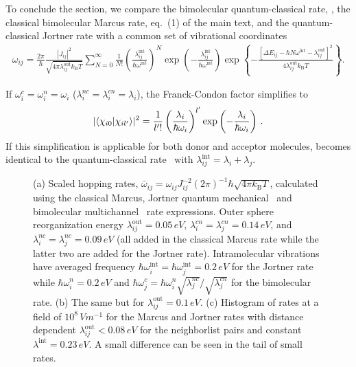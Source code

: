 To conclude the section, we compare the bimolecular quantum-classical rate, , the classical bimolecular Marcus rate, eq.~(1) of the main text, and the quantum-classical Jortner rate with a common set of vibrational coordinates~\cite{may_charge_2003}
\begin{eqnarray}
 \omega_{ij} = \frac{2\pi}{\hbar}  \frac{|J_{ij}|^2}{\sqrt{4\pi \lambda_{ij}^\text{out} k_\text{B}T}} 
 \sum_{N=0}^\infty \frac{1}{N!} \left( \frac{\lambda_{ij}^\text{int}}{\hbar\omega^\text{int}} \right)^{N} 
  \exp \left( - \frac{\lambda_{ij}^\text{int}}{\hbar\omega^\text{int}}\right) 
\exp
\left\{ -\frac{ \left[ \Delta E_{ij}-\hbar N\omega^\text{int} -\lambda_{ij}^\text{out} \right]^2}{4\lambda_{ij}^\text{out} k_\text{B}T}
\right\} .
\label{equ:jortner}
\end{eqnarray}

If $\omega_i^c=\omega_i^n=\omega_i$ ($\lambda_i^{nc}=\lambda_i^{cn}=\lambda_i$), the Franck-Condon factor simplifies to
\begin{equation}
|\langle \chi_{i0} |\chi_{il'} \rangle|^2 = \frac{1}{l'!} \left( \frac{\lambda_i}{\hbar\omega_i} \right)^{l'} \exp \left( - \frac{\lambda_i}{\hbar\omega_i}\right)\,.
\end{equation}
If this simplification is applicable for both donor and acceptor molecules,   becomes identical to the quantum-classical rate~ with $\lambda_{ij}^\text{int}=\lambda_i+\lambda_j$.

\begin{figure*}[ht]
   \caption{ (a) Scaled hopping rates, $\bar{\omega}_{ij} = \omega_{ij}  J_{ij}^{-2} (2\pi)^{-1} \hbar\sqrt{4\pi k_\text{B}T}$, calculated using the classical Marcus, Jortner quantum mechanical~ and bimolecular multichannel~ rate expressions. 
%
Outer sphere reorganization energy $\lambda_{ij}^\text{out}=0.05\, \unit{eV}$,  $\lambda^{cn}_i=\lambda_j^{cn}=0.14\, \unit{eV}$, and $\lambda^{nc}_i=\lambda^{nc}_j=0.09\, \unit{eV}$ (all added in the classical Marcus rate while the latter two are added for the Jortner rate). 
%
Intramolecular vibrations have averaged frequency $\hbar\omega_i^\text{int}=\hbar\omega_j^\text{int}=0.2\, \unit{eV}$ for the Jortner rate while $\hbar\omega_i^n=0.2\, \unit{eV}$ and $\hbar\omega_j^c=\hbar\omega_i^n \sqrt{\lambda_j^{nc}}/\sqrt{\lambda_j^{cn}}$ for the bimolecular rate. 
%
(b) The same but for $\lambda_{ij}^\text{out}=0.1\, \unit{eV}$. 
%
(c) Histogram of rates at a field of $10^8\, \unit{Vm^{-1}}$ for the Marcus and Jortner rates with distance dependent $\lambda_{ij}^\text{out}<0.08\, \unit{eV}$ for the neighborlist pairs and constant $\lambda^\text{int}=0.23\, \unit{eV}$. A small difference can be seen in the tail of small rates.}
   \label{fig:mj_comparison}
\end{figure*}

